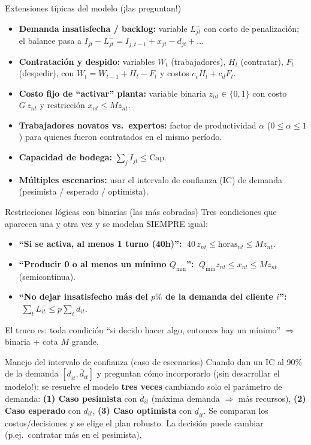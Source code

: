 \begin{definicion}{Extensiones típicas del modelo (¡las preguntan!)}
\begin{itemize}[leftmargin=1.4em, itemsep=1pt]
  \item \textbf{Demanda insatisfecha / backlog:} variable $L_{jt}^-$ con costo de penalización; el balance pasa a $I_{jt} - L_{jt}^- = I_{j,t-1} + x_{jt} - d_{jt} + \ldots$
  \item \textbf{Contratación y despido:} variables $W_t$ (trabajadores), $H_t$ (contratar), $F_t$ (despedir), con $W_t = W_{t-1} + H_t - F_t$ y costos $c_c H_t + c_d F_t$.
  \item \textbf{Costo fijo de ``activar'' planta:} variable binaria $z_{nt}\in\{0,1\}$ con costo $G\,z_{nt}$ y restricción $x_{nt} \le M z_{nt}$.
  \item \textbf{Trabajadores novatos vs.\ expertos:} factor de productividad $\alpha$ ($0\le\alpha\le1$) para quienes fueron contratados en el mismo período.
  \item \textbf{Capacidad de bodega:} $\sum_j I_{jt} \le \text{Cap}$.
  \item \textbf{Múltiples escenarios:} usar el intervalo de confianza (IC) de demanda (pesimista / esperado / optimista).
\end{itemize}
\end{definicion}

\begin{trampa}{Restricciones lógicas con binarias (las más cobradas)}
Tres condiciones que aparecen una y otra vez y se modelan SIEMPRE igual:
\begin{itemize}[leftmargin=1.4em, itemsep=1pt]
  \item \textbf{``Si se activa, al menos 1 turno (40h)'':} $\;40\,z_{nt} \le \text{horas}_{nt} \le M z_{nt}$.
  \item \textbf{``Producir 0 o al menos un mínimo $Q_{\min}$'':} $\;Q_{\min} z_{nt} \le x_{nt} \le M z_{nt}$ (semicontinua).
  \item \textbf{``No dejar insatisfecho más del $p\%$ de la demanda del cliente $i$'':} $\;\sum_t L_{it}^- \le p \sum_t d_{it}$.
\end{itemize}
El truco es: toda condición ``si decido hacer algo, entonces hay un mínimo'' $\Rightarrow$ binaria + cota $M$ grande.
\end{trampa}

\begin{tipprueba}{Manejo del intervalo de confianza (caso de escenarios)}
Cuando dan un IC al 90\% de la demanda $[\underline{d}_{it}, \overline{d}_{it}]$ y preguntan cómo incorporarlo (¡sin desarrollar el modelo!): se resuelve el modelo \textbf{tres veces} cambiando solo el parámetro de demanda:
\textbf{(1) Caso pesimista} con $\overline{d}_{it}$ (máxima demanda $\Rightarrow$ más recursos), \textbf{(2) Caso esperado} con $d_{it}$, \textbf{(3) Caso optimista} con $\underline{d}_{it}$. Se comparan los costos/decisiones y se elige el plan robusto. La decisión puede cambiar (p.ej.\ contratar más en el pesimista).
\end{tipprueba}



